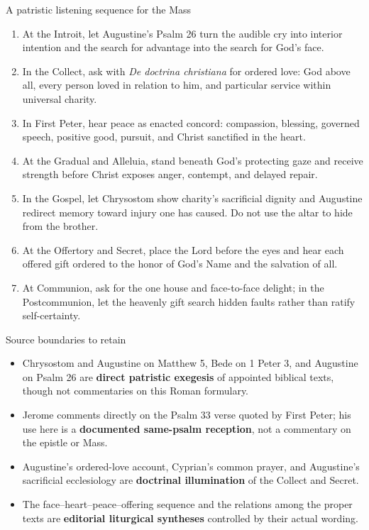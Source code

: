 \begin{deepstudy}
\newpage
\begin{massbox}{A patristic listening sequence for the Mass}
\begin{enumerate}[leftmargin=1.45em,itemsep=0.2em]
\item At the Introit, let Augustine's Psalm 26 turn the audible cry into interior intention and the search for advantage into the search for God's face.
\item In the Collect, ask with \emph{De doctrina christiana} for ordered love: God above all, every person loved in relation to him, and particular service within universal charity.
\item In First Peter, hear peace as enacted concord: compassion, blessing, governed speech, positive good, pursuit, and Christ sanctified in the heart.
\item At the Gradual and Alleluia, stand beneath God's protecting gaze and receive strength before Christ exposes anger, contempt, and delayed repair.
\item In the Gospel, let Chrysostom show charity's sacrificial dignity and Augustine redirect memory toward injury one has caused. Do not use the altar to hide from the brother.
\item At the Offertory and Secret, place the Lord before the eyes and hear each offered gift ordered to the honor of God's Name and the salvation of all.
\item At Communion, ask for the one house and face-to-face delight; in the Postcommunion, let the heavenly gift search hidden faults rather than ratify self-certainty.
\end{enumerate}
\end{massbox}

\begin{studybox}{Source boundaries to retain}
\begin{itemize}
\item Chrysostom and Augustine on Matthew 5, Bede on 1 Peter 3, and Augustine on Psalm 26 are \textbf{direct patristic exegesis} of appointed biblical texts, though not commentaries on this Roman formulary.
\item Jerome comments directly on the Psalm 33 verse quoted by First Peter; his use here is a \textbf{documented same-psalm reception}, not a commentary on the epistle or Mass.
\item Augustine's ordered-love account, Cyprian's common prayer, and Augustine's sacrificial ecclesiology are \textbf{doctrinal illumination} of the Collect and Secret.
\item The face--heart--peace--offering sequence and the relations among the proper texts are \textbf{editorial liturgical syntheses} controlled by their actual wording.
\end{itemize}
\end{studybox}


\end{deepstudy}
